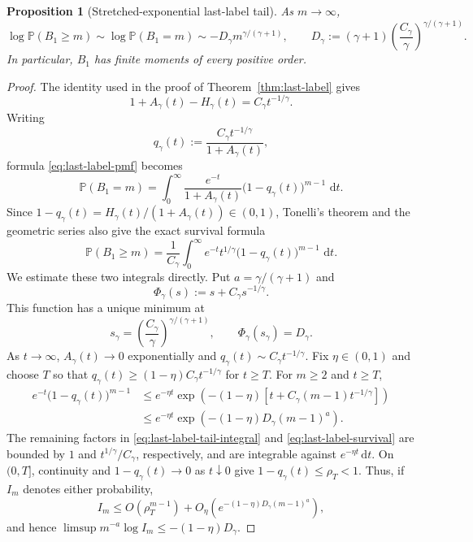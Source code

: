 \documentclass[11pt]{article}
\numberwithin{equation}{section}
\newtheorem{proposition}[theorem]{Proposition}
\theoremstyle{definition}
\theoremstyle{remark}
\newcommand{\Pp}{\mathbb P}
\newcommand{\dd}{\,\mathrm d}
\begin{document}
\begin{proposition}[Stretched-exponential last-label tail]
\label{prop:last-label-tail}
As $m\to\infty$,
\begin{equation}
  \log\Pp(B_1\geq m)
  \sim\log\Pp(B_1=m)
  \sim
  -D_\gamma m^{\gamma/(\gamma+1)},
  \qquad
  D_\gamma:=(\gamma+1)
  \left(\frac{C_\gamma}{\gamma}\right)^{\gamma/(\gamma+1)}.
  \label{eq:last-label-tail}
\end{equation}
In particular, $B_1$ has finite moments of every positive order.
\end{proposition}

\begin{proof}
The identity used in the proof of Theorem~\ref{thm:last-label} gives
\[
  1+A_\gamma(t)-H_\gamma(t)
  =C_\gamma t^{-1/\gamma}.
\]
Writing
\[
  q_\gamma(t):=
  \frac{C_\gamma t^{-1/\gamma}}{1+A_\gamma(t)},
\]
formula \eqref{eq:last-label-pmf} becomes
\begin{equation}
  \Pp(B_1=m)
  =\int_0^\infty
  \frac{e^{-t}}{1+A_\gamma(t)}
  \bigl(1-q_\gamma(t)\bigr)^{m-1}\,\dd t.
  \label{eq:last-label-tail-integral}
\end{equation}
Since $1-q_\gamma(t)=H_\gamma(t)/(1+A_\gamma(t))\in(0,1)$,
Tonelli's theorem and the geometric series also give the exact survival
formula
\begin{equation}
  \Pp(B_1\geq m)
  =\frac1{C_\gamma}\int_0^\infty
  e^{-t}t^{1/\gamma}
  \bigl(1-q_\gamma(t)\bigr)^{m-1}\,\dd t.
  \label{eq:last-label-survival}
\end{equation}
We estimate these two integrals directly.  Put $a=\gamma/(\gamma+1)$ and
\[
  \Phi_\gamma(s):=s+C_\gamma s^{-1/\gamma}.
\]
This function has a unique minimum at
\[
  s_\gamma=
  \left(\frac{C_\gamma}{\gamma}\right)^{\gamma/(\gamma+1)},
  \qquad \Phi_\gamma(s_\gamma)=D_\gamma.
\]
As $t\to\infty$, $A_\gamma(t)\to0$ exponentially and
$q_\gamma(t)\sim C_\gamma t^{-1/\gamma}$.  Fix $\eta\in(0,1)$ and choose
$T$ so that $q_\gamma(t)\geq(1-\eta)C_\gamma t^{-1/\gamma}$ for $t\geq T$.
For $m\geq2$ and $t\geq T$,
\begin{align*}
 e^{-t}\bigl(1-q_\gamma(t)\bigr)^{m-1}
 &\leq e^{-\eta t}
 \exp\left(-(1-\eta)
     \left[t+C_\gamma(m-1)t^{-1/\gamma}\right]\right)\\
 &\leq e^{-\eta t}
 \exp\left(-(1-\eta)D_\gamma(m-1)^a\right).
\end{align*}
The remaining factors in \eqref{eq:last-label-tail-integral} and
\eqref{eq:last-label-survival} are bounded by $1$ and
$t^{1/\gamma}/C_\gamma$, respectively, and are integrable against
$e^{-\eta t}\dd t$.  On $(0,T]$, continuity and
$1-q_\gamma(t)\to0$ as $t\downarrow0$ give
$1-q_\gamma(t)\leq\rho_T<1$.  Thus, if $I_m$ denotes either probability,
\[
  I_m\leq O(\rho_T^{m-1})
  +O_\eta\left(e^{-(1-\eta)D_\gamma(m-1)^a}\right),
\]
and hence $\limsup m^{-a}\log I_m\leq-(1-\eta)D_\gamma$.


\end{proof}
\end{document}
